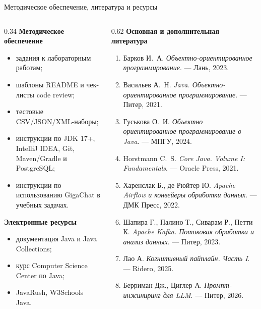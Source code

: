 \documentclass[aspectratio=169,10pt]{beamer}
\begin{document}
\begin{frame}{Методическое обеспечение, литература и ресурсы}
\scriptsize
\begin{columns}[T,onlytextwidth]
\begin{column}{0.34\textwidth}
\textbf{Методическое обеспечение}
\begin{itemize}
  \item задания к лабораторным работам;
  \item шаблоны README и чек-листы code review;
  \item тестовые CSV/JSON/XML-наборы;
  \item инструкции по JDK 17+, IntelliJ IDEA, Git, Maven/Gradle и PostgreSQL;
  \item инструкции по использованию GigaChat в учебных задачах.
\end{itemize}

\textbf{Электронные ресурсы}
\begin{itemize}
  \item документация Java и Java Collections;
  \item курс Computer Science Center по Java;
  \item JavaRush, W3Schools Java.
\end{itemize}
\end{column}
\begin{column}{0.62\textwidth}
\textbf{Основная и дополнительная литература}
\begin{enumerate}
  \item Барков И.~А. \textit{Объектно-ориентированное программирование}. --- Лань, 2023.
  \item Васильев А.~Н. \textit{Java. Объектно-ориентированное программирование}. --- Питер, 2021.
  \item Гуськова О.~И. \textit{Объектно ориентированное программирование в Java}. --- МПГУ, 2024.
  \item Horstmann C.~S. \textit{Core Java. Volume I: Fundamentals}. --- Oracle Press, 2021.
  \item Харенслак Б., де Рюйтер Ю. \textit{Apache Airflow и конвейеры обработки данных}. --- ДМК Пресс, 2022.
  \item Шапира Г., Палино Т., Сиварам Р., Петти К. \textit{Apache Kafka. Потоковая обработка и анализ данных}. --- Питер, 2023.
  \item Лао А. \textit{Когнитивный пайплайн. Часть I}. --- Ridero, 2025.
  \item Берриман Дж., Циглер А. \textit{Промпт-инжиниринг для LLM}. --- Питер, 2026.
\end{enumerate}
\end{column}
\end{columns}
\end{frame}
\end{document}
